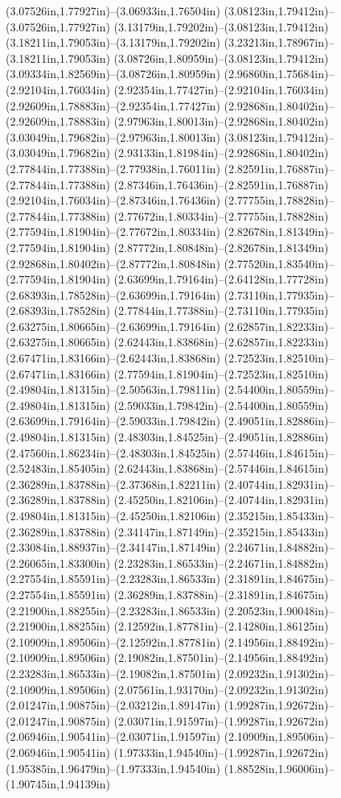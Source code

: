 (3.07526in,1.77927in)--(3.06933in,1.76504in) (3.08123in,1.79412in)--(3.07526in,1.77927in) (3.13179in,1.79202in)--(3.08123in,1.79412in) (3.18211in,1.79053in)--(3.13179in,1.79202in) (3.23213in,1.78967in)--(3.18211in,1.79053in) (3.08726in,1.80959in)--(3.08123in,1.79412in) (3.09334in,1.82569in)--(3.08726in,1.80959in) (2.96860in,1.75684in)--(2.92104in,1.76034in) (2.92354in,1.77427in)--(2.92104in,1.76034in) (2.92609in,1.78883in)--(2.92354in,1.77427in) (2.92868in,1.80402in)--(2.92609in,1.78883in) (2.97963in,1.80013in)--(2.92868in,1.80402in) (3.03049in,1.79682in)--(2.97963in,1.80013in) (3.08123in,1.79412in)--(3.03049in,1.79682in) (2.93133in,1.81984in)--(2.92868in,1.80402in) (2.77844in,1.77388in)--(2.77938in,1.76011in) (2.82591in,1.76887in)--(2.77844in,1.77388in) (2.87346in,1.76436in)--(2.82591in,1.76887in) (2.92104in,1.76034in)--(2.87346in,1.76436in) (2.77755in,1.78828in)--(2.77844in,1.77388in) (2.77672in,1.80334in)--(2.77755in,1.78828in) (2.77594in,1.81904in)--(2.77672in,1.80334in) (2.82678in,1.81349in)--(2.77594in,1.81904in) (2.87772in,1.80848in)--(2.82678in,1.81349in) (2.92868in,1.80402in)--(2.87772in,1.80848in) (2.77520in,1.83540in)--(2.77594in,1.81904in) (2.63699in,1.79164in)--(2.64128in,1.77728in) (2.68393in,1.78528in)--(2.63699in,1.79164in) (2.73110in,1.77935in)--(2.68393in,1.78528in) (2.77844in,1.77388in)--(2.73110in,1.77935in) (2.63275in,1.80665in)--(2.63699in,1.79164in) (2.62857in,1.82233in)--(2.63275in,1.80665in) (2.62443in,1.83868in)--(2.62857in,1.82233in) (2.67471in,1.83166in)--(2.62443in,1.83868in) (2.72523in,1.82510in)--(2.67471in,1.83166in) (2.77594in,1.81904in)--(2.72523in,1.82510in) (2.49804in,1.81315in)--(2.50563in,1.79811in) (2.54400in,1.80559in)--(2.49804in,1.81315in) (2.59033in,1.79842in)--(2.54400in,1.80559in) (2.63699in,1.79164in)--(2.59033in,1.79842in) (2.49051in,1.82886in)--(2.49804in,1.81315in) (2.48303in,1.84525in)--(2.49051in,1.82886in) (2.47560in,1.86234in)--(2.48303in,1.84525in) (2.57446in,1.84615in)--(2.52483in,1.85405in) (2.62443in,1.83868in)--(2.57446in,1.84615in) (2.36289in,1.83788in)--(2.37368in,1.82211in) (2.40744in,1.82931in)--(2.36289in,1.83788in) (2.45250in,1.82106in)--(2.40744in,1.82931in) (2.49804in,1.81315in)--(2.45250in,1.82106in) (2.35215in,1.85433in)--(2.36289in,1.83788in) (2.34147in,1.87149in)--(2.35215in,1.85433in) (2.33084in,1.88937in)--(2.34147in,1.87149in) (2.24671in,1.84882in)--(2.26065in,1.83300in) (2.23283in,1.86533in)--(2.24671in,1.84882in) (2.27554in,1.85591in)--(2.23283in,1.86533in) (2.31891in,1.84675in)--(2.27554in,1.85591in) (2.36289in,1.83788in)--(2.31891in,1.84675in) (2.21900in,1.88255in)--(2.23283in,1.86533in) (2.20523in,1.90048in)--(2.21900in,1.88255in) (2.12592in,1.87781in)--(2.14280in,1.86125in) (2.10909in,1.89506in)--(2.12592in,1.87781in) (2.14956in,1.88492in)--(2.10909in,1.89506in) (2.19082in,1.87501in)--(2.14956in,1.88492in) (2.23283in,1.86533in)--(2.19082in,1.87501in) (2.09232in,1.91302in)--(2.10909in,1.89506in) (2.07561in,1.93170in)--(2.09232in,1.91302in) (2.01247in,1.90875in)--(2.03212in,1.89147in) (1.99287in,1.92672in)--(2.01247in,1.90875in) (2.03071in,1.91597in)--(1.99287in,1.92672in) (2.06946in,1.90541in)--(2.03071in,1.91597in) (2.10909in,1.89506in)--(2.06946in,1.90541in) (1.97333in,1.94540in)--(1.99287in,1.92672in) (1.95385in,1.96479in)--(1.97333in,1.94540in) (1.88528in,1.96006in)--(1.90745in,1.94139in) 